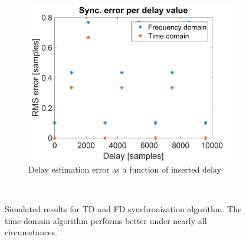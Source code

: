 \documentclass[a4paper, notitlepage]{report}
\begin{document}
\begin{figure}[h!]
\begin{adjustwidth}{-1in}{-1in}
	\begin{subfigure}{0.5\textwidth}
		\includegraphics[width=\textwidth]{figures/sync-simulation/error-vs-delay}
		\caption{Delay estimation error as a function of inserted delay}
		\label{app:sync-simulation-delay}
	\end{subfigure}
	\begin{subfigure}{0.5\textwidth}
	~
	\end{subfigure}
\end{adjustwidth}
\caption[Full TD and FD synchronization simulation results.]{Simulated results for TD and FD synchronization algorithm. The time-domain algorithm performs better under nearly all circumstances.}
\label{app:sync-simulation}
\end{figure}

	
\end{document}
